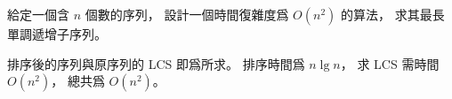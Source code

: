 \startEXERCISE
給定一個含 $n$ 個數的序列，
設計一個時間復雜度爲 $O(n^2)$ 的算法，
求其最長單調遞增子序列。
\stopEXERCISE

\startANSWER
排序後的序列與原序列的 LCS 即爲所求。
排序時間爲 $n\lg n$，
求 LCS 需時間 $O(n^2)$，
總共爲 $O(n^2)$。
\stopANSWER
